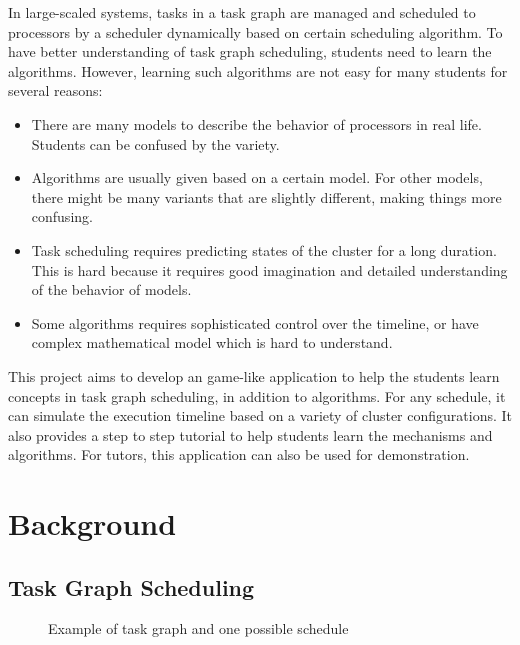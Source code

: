 \documentclass[msc,deptreport, cs]{infthesis}
\begin{document}
In large-scaled systems, tasks in a task graph are managed and scheduled to processors by a scheduler dynamically based on certain scheduling algorithm. To have better understanding of task graph scheduling, students need to learn the algorithms. However, learning such algorithms are not easy for many students for several reasons:

\begin{itemize}
  \item There are many models to describe the behavior of processors in real life. Students can be confused by the variety.
  \item Algorithms are usually given based on a certain model. For other models, there might be many variants that are slightly different, making things more confusing.
  \item Task scheduling requires predicting states of the cluster for a long duration. This is hard because it requires good imagination and detailed understanding of the behavior of models.
  \item Some algorithms requires sophisticated control over the timeline, or have complex mathematical model which is hard to understand.
\end{itemize}

This project aims to develop an game-like application to help the students learn concepts in task graph scheduling, in addition to algorithms. For any schedule, it can simulate the execution timeline based on a variety of cluster configurations. It also provides a step to step tutorial to help students learn the mechanisms and algorithms. For tutors, this application can also be used for demonstration.

\chapter{Background}

\section{Task Graph Scheduling}

\begin{figure}[htpb]
  \centering
   \hspace{2em}
  \caption{Example of task graph and one possible schedule}
  \label{fig:example}
\end{figure}
\end{document}
